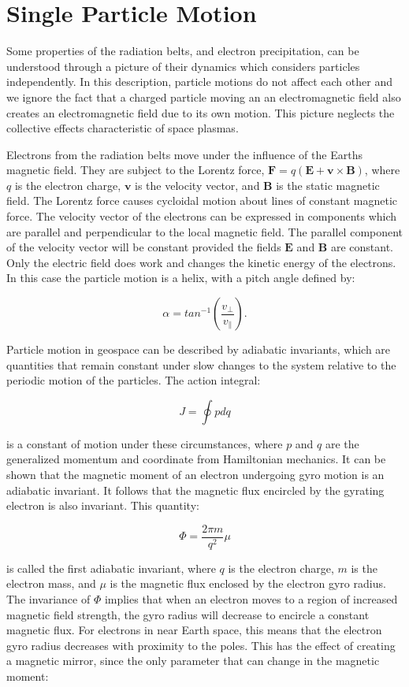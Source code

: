  \section{Single Particle Motion}
 
 Some properties of the radiation belts, and electron precipitation, can be understood through a picture of their dynamics which considers particles independently. In this description, particle motions do not affect each other and we ignore the fact that a charged particle moving an an electromagnetic field also creates an electromagnetic field due to its own motion. This picture neglects the collective effects characteristic of space plasmas. 
 
Electrons from the radiation belts move under the influence of the Earths magnetic field. They are subject to the Lorentz force, $\mathbf{F} = q(\mathbf{E} + \mathbf{v}\times\mathbf{B})$, where $q$ is the electron charge, $\mathbf{v}$ is the velocity vector, and $\mathbf{B}$ is the static magnetic field. The Lorentz force causes cycloidal motion about lines of constant magnetic force. The velocity vector of the electrons can be expressed in components which are parallel and perpendicular to the local magnetic field. The parallel component of the velocity vector will be constant provided the fields $\mathbf{E}$ and $\mathbf{B}$ are constant. Only the electric field does work and changes the kinetic energy of the electrons. In this case the particle motion is a helix, with a pitch angle defined by:

$$\alpha = tan^{-1}\left(\frac{v_\perp}{v_\parallel}\right).$$

Particle motion in geospace can be described by adiabatic invariants, which are quantities that remain constant under slow changes to the system relative to the periodic motion of the particles. The action integral:

$$J = \oint p dq$$

is a constant of motion under these circumstances, where $p$ and $q$ are the generalized momentum and coordinate from Hamiltonian mechanics. It can be shown that the magnetic moment of an electron undergoing gyro motion is an adiabatic invariant. It follows that the magnetic flux encircled by the gyrating electron is also invariant. This quantity:

$$\Phi = \frac{2\pi m}{q^2}\mu$$

is called the first adiabatic invariant, where $q$ is the electron charge, $m$ is the electron mass, and $\mu$ is the magnetic flux enclosed by the electron gyro radius. The invariance of $\Phi$ implies that when an electron moves to a region of increased magnetic field strength, the gyro radius will decrease to encircle  a constant magnetic flux. For electrons in near Earth space, this means that the electron gyro radius decreases with proximity to the poles. This has the effect of creating a magnetic mirror, since the only parameter that can change in the magnetic moment:

